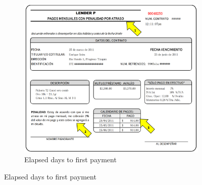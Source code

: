 \documentclass[11pt]{article}
\begin{document}
\vspace{.1in}
\begin{figure}[H]
     \caption{Contract Terms Summary, and Promise Slip}
    \label{PaperSlip}
    \begin{center}
    \begin{subfigure}{0.65\textwidth}
    \caption{Elapsed days to first payment}
        \centering
        \includegraphics[width=\textwidth]{Figuras/TicketLenderP.png}
    \end{subfigure}
    

\end{center}
\end{figure}
\end{document}
